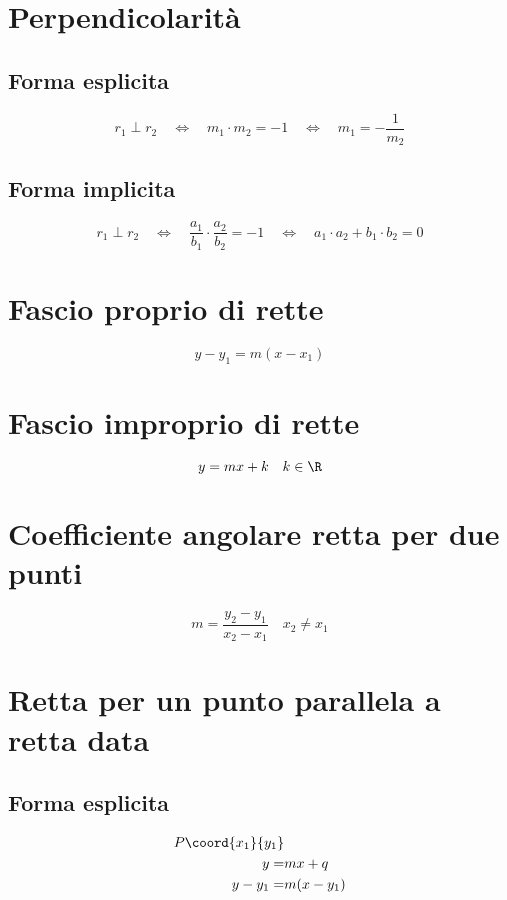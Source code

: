 \section{Perpendicolarità}
\subsection{Forma esplicita}
\begin{equation*}
r_1\perp r_2\quad\Longleftrightarrow\quad	m_1 \cdot m_2=-1\quad\Longleftrightarrow\quad	m_1=-\dfrac{1}{m_2}
\end{equation*}
\subsection{Forma implicita}
\begin{equation*}
r_1\perp r_2\quad\Longleftrightarrow\quad	\dfrac{a_1}{b_1}\cdot\dfrac{a_2}{b_2}=-1\quad\Longleftrightarrow\quad a_1\cdot a_2+b_1\cdot b_2=0
\end{equation*}
\section{Fascio proprio di rette}
\begin{equation*}
y-y_1=m(x-x_1)
\end{equation*}
\section{Fascio improprio di rette}
\begin{equation*}
y=mx+k\quad k\in\R
\end{equation*}
\section{Coefficiente angolare retta per due punti}
\begin{equation*}
m=\dfrac{y_2-y_1}{x_2-x_1}\quad x_2\neq x_1
\end{equation*}
\section{Retta per un punto parallela a retta data}
\subsection{Forma esplicita}
\begin{align*}
P\coord{x_1}{y_1}&\nonumber\\
y=&mx+q\nonumber\\
y-y_1=&m(x-y_1)
\end{align*}
